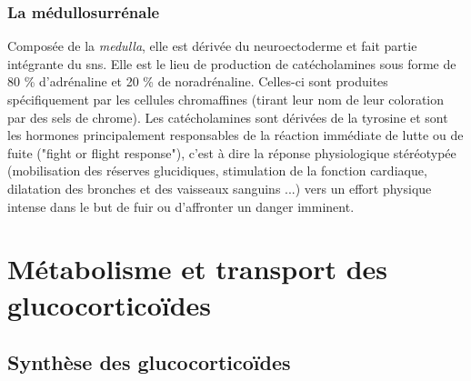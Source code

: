 \documentclass[../main.tex]{subfiles}
\begin{document}
\subsubsection{La médullosurrénale}
Composée de la \textit{medulla}, elle est dérivée du neuroectoderme et fait partie intégrante du \gls{sns}.
Elle est le lieu de production de catécholamines sous forme de 80 \% d'adrénaline et 20 \% de noradrénaline.
Celles-ci sont produites spécifiquement par les cellules chromaffines (tirant leur nom de leur coloration par des sels de chrome).
Les catécholamines sont dérivées de la tyrosine et sont les hormones principalement responsables de la réaction immédiate de lutte ou de fuite ("fight or flight response"), c'est à dire la réponse physiologique stéréotypée (mobilisation des réserves glucidiques, stimulation de la fonction cardiaque, dilatation des bronches et des vaisseaux sanguins ...) vers un effort physique intense dans le but de fuir ou d'affronter un danger imminent.





\section{Métabolisme et transport des glucocorticoïdes}


\subsection{Synthèse des glucocorticoïdes}
\end{document}
